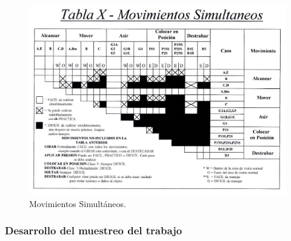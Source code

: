     \begin{figure}[H]
        \centering
        \includegraphics[scale=0.35]{3/Img/tabla10MovimientosSimultaneos.pdf}
        \caption{Movimientos Simultáneos.}
        \label{fig:tabla10MovimientosSimultaneos}
    \end{figure}
    \cite{STP}
    \subsubsection{Desarrollo del muestreo del trabajo}
    
